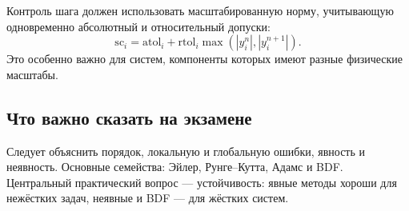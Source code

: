 Контроль шага должен использовать масштабированную норму, учитывающую одновременно
абсолютный и относительный допуски:
\[
    \mathrm{sc}_i
    =\mathrm{atol}_i
    +\mathrm{rtol}_i\max(|y_i^n|,|y_i^{n+1}|).
\]
Это особенно важно для систем, компоненты которых имеют разные физические масштабы.

\subsection{Что важно сказать на экзамене}

Следует объяснить порядок, локальную и глобальную ошибки, явность и неявность.
Основные семейства: Эйлер, Рунге--Кутта, Адамс и BDF. Центральный практический
вопрос --- устойчивость: явные методы хороши для нежёстких задач, неявные и BDF
--- для жёстких систем.

\newpage